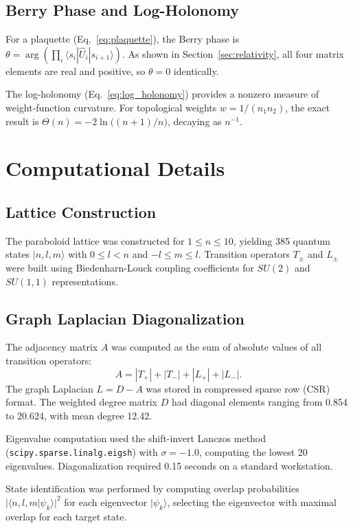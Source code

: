 \documentclass[aps,pra,twocolumn,superscriptaddress,longbibliography]{revtex4-2}
\begin{document}
\subsection{Berry Phase and Log-Holonomy}

For a plaquette (Eq.~\ref{eq:plaquette}), the Berry phase is
$\theta = \arg(\prod_i \langle s_i | \hat{U}_i | s_{i+1}\rangle)$.
As shown in Section~\ref{sec:relativity}, all four matrix elements are real
and positive, so $\theta = 0$ identically.

The log-holonomy (Eq.~\ref{eq:log_holonomy}) provides a nonzero measure of
weight-function curvature.  For topological weights $w = 1/(n_1 n_2)$, the
exact result is $\Theta(n) = -2\ln\bigl((n+1)/n\bigr)$, decaying as
$n^{-1}$.


\section{Computational Details}

\subsection{Lattice Construction}

The paraboloid lattice was constructed for $1 \leq n \leq 10$, yielding 385 quantum states $|n, l, m\rangle$ with $0 \leq l < n$ and $-l \leq m \leq l$. Transition operators $T_\pm$ and $L_\pm$ were built using Biedenharn-Louck coupling coefficients for $SU(2)$ and $SU(1,1)$ representations.

\subsection{Graph Laplacian Diagonalization}

The adjacency matrix $A$ was computed as the sum of absolute values of all transition operators:
\begin{equation}
A = |T_+| + |T_-| + |L_+| + |L_-|.
\end{equation}
The graph Laplacian $L = D - A$ was stored in compressed sparse row (CSR) format. The weighted degree matrix $D$ had diagonal elements ranging from 0.854 to 20.624, with mean degree 12.42.

Eigenvalue computation used the shift-invert Lanczos method (\texttt{scipy.sparse.linalg.eigsh}) with $\sigma = -1.0$, computing the lowest 20 eigenvalues. Diagonalization required 0.15 seconds on a standard workstation.

State identification was performed by computing overlap probabilities $|\langle n,l,m | \psi_k \rangle|^2$ for each eigenvector $|\psi_k\rangle$, selecting the eigenvector with maximal overlap for each target state.
\end{document}
